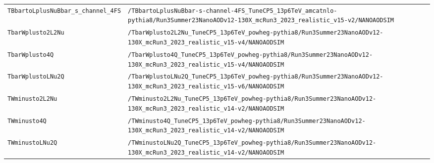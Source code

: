 \begin{longtable}{@{}>{\RaggedRight\arraybackslash}p{} >{\RaggedRight\arraybackslash}p{}@{}}
\addlinespace[2pt]
\texttt{TBbartoLplusNuBbar\_\allowbreak{}s\_\allowbreak{}channel\_\allowbreak{}4FS} & \texttt{/\allowbreak{}TBbartoLplusNuBbar-\allowbreak{}s-\allowbreak{}channel-\allowbreak{}4FS\_\allowbreak{}TuneCP5\_\allowbreak{}13p6TeV\_\allowbreak{}amcatnlo-\allowbreak{}pythia8/\allowbreak{}Run3Summer23NanoAODv12-\allowbreak{}130X\_\allowbreak{}mcRun3\_\allowbreak{}2023\_\allowbreak{}realistic\_\allowbreak{}v15-\allowbreak{}v2/\allowbreak{}NANOAODSIM} \\
\addlinespace[2pt]
\texttt{TbarWplusto2L2Nu} & \texttt{/\allowbreak{}TbarWplusto2L2Nu\_\allowbreak{}TuneCP5\_\allowbreak{}13p6TeV\_\allowbreak{}powheg-\allowbreak{}pythia8/\allowbreak{}Run3Summer23NanoAODv12-\allowbreak{}130X\_\allowbreak{}mcRun3\_\allowbreak{}2023\_\allowbreak{}realistic\_\allowbreak{}v15-\allowbreak{}v4/\allowbreak{}NANOAODSIM} \\
\addlinespace[2pt]
\texttt{TbarWplusto4Q} & \texttt{/\allowbreak{}TbarWplusto4Q\_\allowbreak{}TuneCP5\_\allowbreak{}13p6TeV\_\allowbreak{}powheg-\allowbreak{}pythia8/\allowbreak{}Run3Summer23NanoAODv12-\allowbreak{}130X\_\allowbreak{}mcRun3\_\allowbreak{}2023\_\allowbreak{}realistic\_\allowbreak{}v15-\allowbreak{}v4/\allowbreak{}NANOAODSIM} \\
\addlinespace[2pt]
\texttt{TbarWplustoLNu2Q} & \texttt{/\allowbreak{}TbarWplustoLNu2Q\_\allowbreak{}TuneCP5\_\allowbreak{}13p6TeV\_\allowbreak{}powheg-\allowbreak{}pythia8/\allowbreak{}Run3Summer23NanoAODv12-\allowbreak{}130X\_\allowbreak{}mcRun3\_\allowbreak{}2023\_\allowbreak{}realistic\_\allowbreak{}v15-\allowbreak{}v6/\allowbreak{}NANOAODSIM} \\
\addlinespace[2pt]
\texttt{TWminusto2L2Nu} & \texttt{/\allowbreak{}TWminusto2L2Nu\_\allowbreak{}TuneCP5\_\allowbreak{}13p6TeV\_\allowbreak{}powheg-\allowbreak{}pythia8/\allowbreak{}Run3Summer23NanoAODv12-\allowbreak{}130X\_\allowbreak{}mcRun3\_\allowbreak{}2023\_\allowbreak{}realistic\_\allowbreak{}v14-\allowbreak{}v2/\allowbreak{}NANOAODSIM} \\
\addlinespace[2pt]
\texttt{TWminusto4Q} & \texttt{/\allowbreak{}TWminusto4Q\_\allowbreak{}TuneCP5\_\allowbreak{}13p6TeV\_\allowbreak{}powheg-\allowbreak{}pythia8/\allowbreak{}Run3Summer23NanoAODv12-\allowbreak{}130X\_\allowbreak{}mcRun3\_\allowbreak{}2023\_\allowbreak{}realistic\_\allowbreak{}v14-\allowbreak{}v2/\allowbreak{}NANOAODSIM} \\
\addlinespace[2pt]
\texttt{TWminustoLNu2Q} & \texttt{/\allowbreak{}TWminustoLNu2Q\_\allowbreak{}TuneCP5\_\allowbreak{}13p6TeV\_\allowbreak{}powheg-\allowbreak{}pythia8/\allowbreak{}Run3Summer23NanoAODv12-\allowbreak{}130X\_\allowbreak{}mcRun3\_\allowbreak{}2023\_\allowbreak{}realistic\_\allowbreak{}v14-\allowbreak{}v2/\allowbreak{}NANOAODSIM} \\

\end{longtable}
